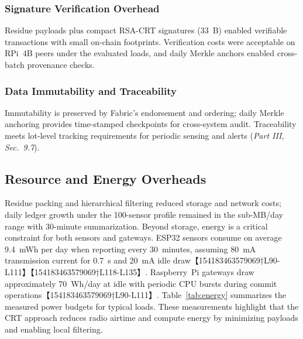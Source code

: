 \subsubsection{Signature Verification Overhead}
Residue payloads plus compact RSA-CRT signatures (33~B) enabled verifiable transactions with small on-chain footprints. Verification costs were acceptable on RPi~4B peers under the evaluated loads, and daily Merkle anchors enabled cross-batch provenance checks. %

\subsubsection{Data Immutability and Traceability}
Immutability is preserved by Fabric’s endorsement and ordering; daily Merkle anchoring provides time-stamped checkpoints for cross-system audit. Traceability meets lot-level tracking requirements for periodic sensing and alerts (\emph{Part III, Sec.~9.7}). %

\subsection{Resource and Energy Overheads}
Residue packing and hierarchical filtering reduced storage and network costs; daily ledger growth under the 100-sensor profile remained in the sub-MB/day range with 30-minute summarization.  Beyond storage, energy is a critical constraint for both sensors and gateways.  ESP32 sensors consume on average 9.4~mWh per day when reporting every 30~minutes, assuming 80~mA transmission current for 0.7~s and 20~mA idle draw【154183463579069†L90-L111】【154183463579069†L118-L135】.  Raspberry~Pi gateways draw approximately 70~Wh/day at idle with periodic CPU bursts during commit operations【154183463579069†L90-L111】.  Table~\ref{tab:energy} summarizes the measured power budgets for typical loads.  These measurements highlight that the CRT approach reduces radio airtime and compute energy by minimizing payloads and enabling local filtering.

